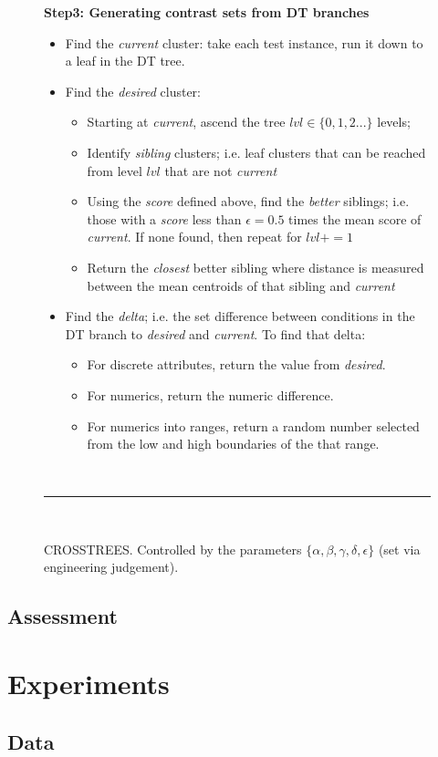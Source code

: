 \documentclass{sig-alternate}
\newcommand{\bi}{\begin{itemize}[leftmargin=0.4cm]}
\newcommand{\ei}{\end{itemize}}
\begin{document}
\begin{figure}[t]
		{\bf Step3: Generating contrast sets from DT branches}
		\begin{itemize}
		\item Find the {\em current } cluster: take each test instance, run it down to a leaf in the DT tree.  
		\item Find the {\em desired} cluster: 
		\bi
		\item Starting at {\em current}, ascend the tree $lvl\in \{0,1,2...\}$ levels;
		\item Identify {\em sibling} clusters; i.e. leaf clusters that can be reached from level $lvl$ that are not {\em current }
		\item Using the {\em score} defined above, find the {\em better} siblings; i.e. those with a {\em score} less than $\epsilon=0.5$ times the mean score of {\em current}. If none found, then repeat for $lvl += 1$
		\item  Return the {\em closest} better sibling where distance is measured between the mean centroids of that sibling and {\em current}
		\ei
		\item Find the {\em delta}; i.e. the set difference between  conditions in the DT branch to {\em desired} and {\em current}. To find that delta:
		\bi
		\item
		For discrete attributes,  return the value from {\em desired}. 
		\item
		For  numerics, return the numeric difference. 
		\item
		For numerics  into ranges, return a random number selected from the low and high boundaries of the that range.
	\ei
	\ei
		~\hrule~
		\caption{CROSSTREES. Controlled by the parameters
		$\{\alpha, \beta, \gamma, \delta, \epsilon\}$ (set via engineering judgement).}
		\label{fig:xtrees_bare}
	\end{figure}

\subsection{Assessment}
\section{Experiments}
\subsection{Data}
\end{document}
